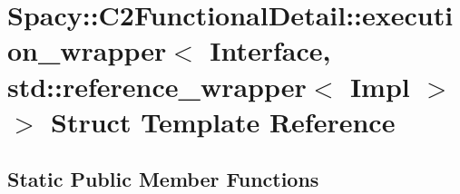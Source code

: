 \hypertarget{structSpacy_1_1C2FunctionalDetail_1_1execution__wrapper_3_01Interface_00_01std_1_1reference__wrapper_3_01Impl_01_4_01_4}{\section{\-Spacy\-:\-:\-C2\-Functional\-Detail\-:\-:execution\-\_\-wrapper$<$ \-Interface, std\-:\-:reference\-\_\-wrapper$<$ \-Impl $>$ $>$ \-Struct \-Template \-Reference}
\label{structSpacy_1_1C2FunctionalDetail_1_1execution__wrapper_3_01Interface_00_01std_1_1reference__wrapper_3_01Impl_01_4_01_4}
}
\subsection*{\-Static \-Public \-Member \-Functions}
